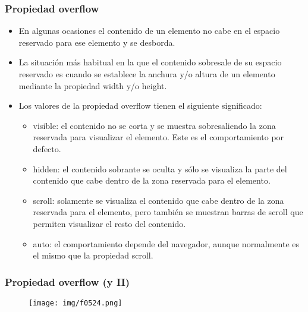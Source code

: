 
\begin{frame}
\frametitle{Propiedad overflow}

\begin{itemize}
  \item En algunas ocasiones el contenido de un elemento no cabe en el espacio reservado para ese elemento y se desborda.
  \item La situación más habitual en la que el contenido sobresale de su espacio reservado es cuando se establece la anchura y/o altura de un elemento mediante la propiedad width y/o height. 
  \item Los valores de la propiedad overflow tienen el siguiente significado:
  \begin{itemize}
    \item visible: el contenido no se corta y se muestra sobresaliendo la zona reservada para visualizar el elemento. Este es el comportamiento por defecto.
    \item hidden: el contenido sobrante se oculta y sólo se visualiza la parte del contenido que cabe dentro de la zona reservada para el elemento.
    \item scroll: solamente se visualiza el contenido que cabe dentro de la zona reservada para el elemento, pero también se muestran barras de scroll que permiten visualizar el resto del contenido.
    \item auto: el comportamiento depende del navegador, aunque normalmente es el mismo que la propiedad scroll.
  \end{itemize}
\end{itemize}

\end{frame}



\begin{frame}
\frametitle{Propiedad overflow (y II)}

\begin{center}
\begin{figure}[p]
\texttt{[image: img/f0524.png]}
\end{figure}
\end{center}

\end{frame}



